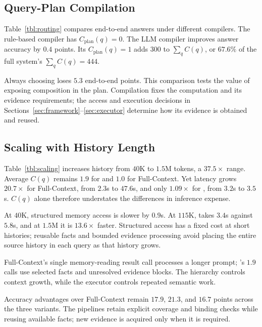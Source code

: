 \subsection{Query-Plan Compilation}
\label{subsec:exp7routing}



Table~\ref{tbl:routing} compares end-to-end answers under different
compilers. The rule-based compiler has $C_{\mathrm{plan}}(q)=0$.
The LLM compiler improves answer accuracy by $0.4$ points.
Its $C_{\mathrm{plan}}(q)=1$ adds $300$ to $\sum_q C(q)$, or
$67.6\%$ of the full system's $\sum_q C(q)=444$.

Always choosing \point{} loses $5.3$ end-to-end points. This comparison
tests the value of exposing composition in the plan. Compilation fixes
the computation and its evidence requirements; the access and execution decisions in
Sections~\ref{sec:framework}--\ref{sec:executor} determine how its evidence
is obtained and reused.



\subsection{Scaling with History Length}
\label{subsec:exp8}



Table~\ref{tbl:scaling} increases history from $40$K to $1.5$M tokens,
a $37.5\times$ range. Average $C(q)$ remains $1.9$ for \sys{}
and $1.0$ for Full-Context. Yet latency grows $20.7\times$ for
Full-Context, from $2.3$s to $47.6$s, and only $1.09\times$ for
\sys{}, from $3.2$s to $3.5$s. $C(q)$ alone therefore understates
the differences in inference expense.

At $40$K, structured memory access is slower by $0.9$s. At $115$K,
\sys{} takes $3.4$s against $5.8$s, and at $1.5$M it is
$13.6\times$ faster. Structured access has a fixed cost at short histories;
reusable facts and bounded evidence processing avoid placing the entire
source history in each query as that history grows.

Full-Context's single memory-reading result call processes a longer prompt;
\sys{}'s $1.9$ calls use selected facts and unresolved evidence blocks.
The hierarchy controls context growth, while the executor controls
repeated semantic work.

Accuracy advantages over Full-Context remain $17.9$, $21.3$, and
$16.7$ points across the three variants.
The pipelines retain explicit coverage and binding checks while reusing
available facts; new evidence is acquired only when it is required.

